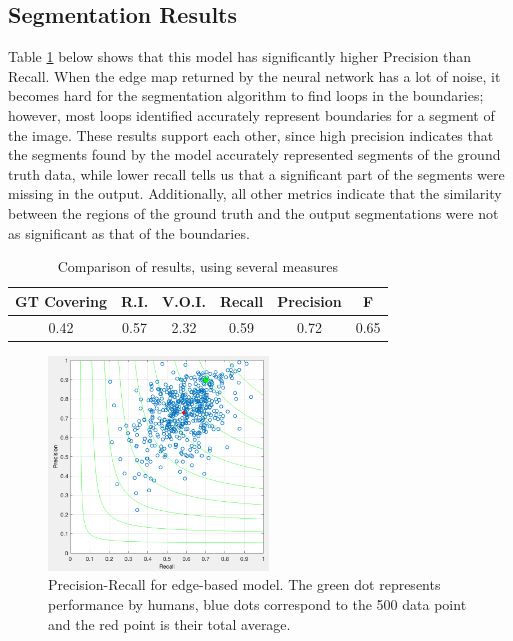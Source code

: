 \documentclass[10pt, twocolumn, twoside]{article}
\newcommand{\squeezeup}{\vspace{-2.5mm}}
\begin{document}
\subsection{Segmentation Results}
\squeezeup
Table \ref{table:segresults1} below shows that this model has significantly higher Precision than Recall. When the edge map returned by the neural network has a lot of noise, it becomes hard for the segmentation algorithm to find loops in the boundaries; however, most loops identified accurately represent boundaries for a segment of the image. These results support each other, since high precision indicates that the segments found by the model accurately represented segments of the ground truth data, while lower recall tells us that a significant part of the segments were missing in the output. Additionally, all other metrics indicate that the similarity between the regions of the ground truth and the output segmentations were not as significant as that of the boundaries.


\begin{table}[ht]
\caption{Comparison of results, using several measures} %
\centering %
\begin{tabular}{c c c c c c} %
\hline\hline %
GT Covering & R.I. & V.O.I. & Recall & Precision & F \\ [0.5ex] %
\hline %
 0.42 & 0.57 & 2.32 & 0.59 & 0.72 & 0.65 \\ 
\hline %
\end{tabular}
\label{table:segresults1} %
\end{table}

\begin{figure}[h]
	\centering
	\includegraphics[width=2.3in]{images/F-NN.png}
    \caption{Precision-Recall for edge-based model. The green dot represents performance by humans, blue dots correspond to the 500 data point and the red point is their total average.}
    \label{fig:F-NN}
\end{figure}
\end{document}
